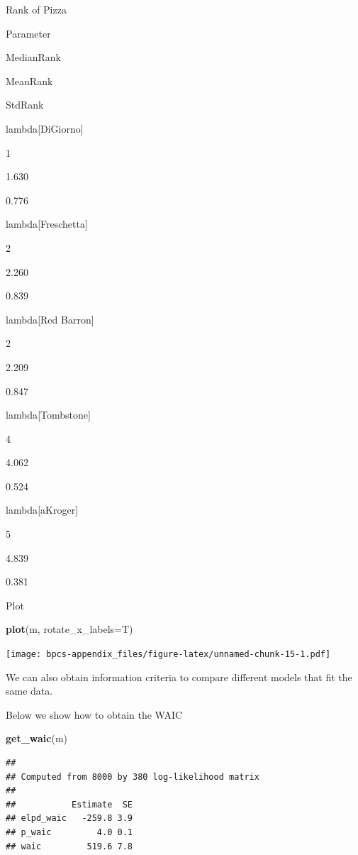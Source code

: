 \documentclass[
]{book}
\newenvironment{Shaded}{\begin{snugshade}}{\end{snugshade}}
\newcommand{\DataTypeTok}[1]{\textcolor[rgb]{0.13,0.29,0.53}{#1}}
\newcommand{\KeywordTok}[1]{\textcolor[rgb]{0.13,0.29,0.53}{\textbf{#1}}}
\newcommand{\NormalTok}[1]{#1}
\begin{document}
\label{tab:unnamed-chunk-14}Rank of Pizza

Parameter

MedianRank

MeanRank

StdRank

lambda{[}DiGiorno{]}

1

1.630

0.776

lambda{[}Freschetta{]}

2

2.260

0.839

lambda{[}Red Barron{]}

2

2.209

0.847

lambda{[}Tombstone{]}

4

4.062

0.524

lambda{[}aKroger{]}

5

4.839

0.381

Plot

\begin{Shaded}
\begin{Highlighting}[]
\KeywordTok{plot}\NormalTok{(m, }\DataTypeTok{rotate_x_labels=}\NormalTok{T)}
\end{Highlighting}
\end{Shaded}

\texttt{[image: bpcs-appendix\_files/figure-latex/unnamed-chunk-15-1.pdf]}

We can also obtain information criteria to compare different models that fit the same data.

Below we show how to obtain the WAIC

\begin{Shaded}
\begin{Highlighting}[]
\KeywordTok{get_waic}\NormalTok{(m)}
\end{Highlighting}
\end{Shaded}

\begin{verbatim}
## 
## Computed from 8000 by 380 log-likelihood matrix
## 
##           Estimate  SE
## elpd_waic   -259.8 3.9
## p_waic         4.0 0.1
## waic         519.6 7.8
\end{verbatim}
\end{document}
